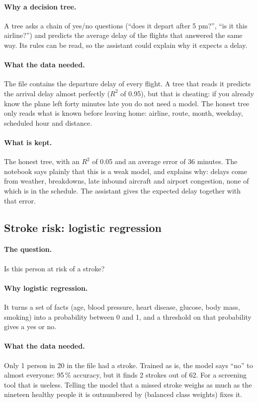 \paragraph{Why a decision tree.} A tree asks a chain of yes/no questions
(``does it depart after 5 pm?'', ``is it this airline?'') and predicts the
average delay of the flights that answered the same way. Its rules can be
read, so the assistant could explain why it expects a delay.

\paragraph{What the data needed.} The file contains the departure delay
of every flight. A tree that reads it predicts the arrival delay almost
perfectly ($R^2$ of 0.95), but that is cheating: if you already know the
plane left forty minutes late you do not need a model. The honest tree only
reads what is known before leaving home: airline, route, month, weekday,
scheduled hour and distance.

\paragraph{What is kept.} The honest tree, with an $R^2$ of 0.05 and an
average error of 36 minutes. The notebook says plainly that this is a weak
model, and explains why: delays come from weather, breakdowns, late
inbound aircraft and airport congestion, none of which is in the schedule.
The assistant gives the expected delay together with that error.

\subsection{Stroke risk: logistic regression}

\paragraph{The question.} Is this person at risk of a stroke?

\paragraph{Why logistic regression.} It turns a set of facts (age, blood
pressure, heart disease, glucose, body mass, smoking) into a probability
between 0 and 1, and a threshold on that probability gives a yes or no.

\paragraph{What the data needed.} Only 1 person in 20 in the file had a
stroke. Trained as is, the model says ``no'' to almost everyone: 95\,\%
accuracy, but it finds 2 strokes out of 62. For a screening tool that is
useless. Telling the model that a missed stroke weighs as much as the
nineteen healthy people it is outnumbered by (balanced class weights)
fixes it.

